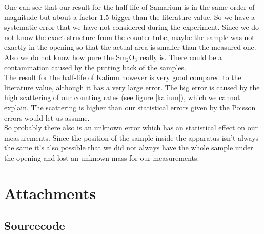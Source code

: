 \documentclass[12pt]{article}
\begin{document}
One can see that our result for the half-life of Samarium is in the same order of magnitude but about a factor 1.5 bigger than the literature value. So we have a systematic error that we have not considered during the experiment. Since we do not know the exact structure from the counter tube, maybe the sample was not exactly in the opening so that the actual area is smaller than the measured one.\\
Also we do not know how pure the Sm$_2$O$_3$ really is. There could be a contamination caused by the putting back of the samples.\\

The result for the half-life of Kalium however is very good compared to the literature value, although it has a very large error. The big error is caused by the high scattering of our counting rates (see figure \ref{kalium}), which we cannot explain. The scattering is higher than our statistical errors given by the Poisson errors would let us assume.\\

So probably there also is an unknown error which has an statistical effect on our measurements. Since the position of the sample inside the apparatus isn't always the same it's also possible that we did not always have the whole sample under the opening and lost an unknown mass for our measurements.

\newpage
\section{Attachments}









\subsection{Sourcecode}

\ 

%


%
\end{document}
